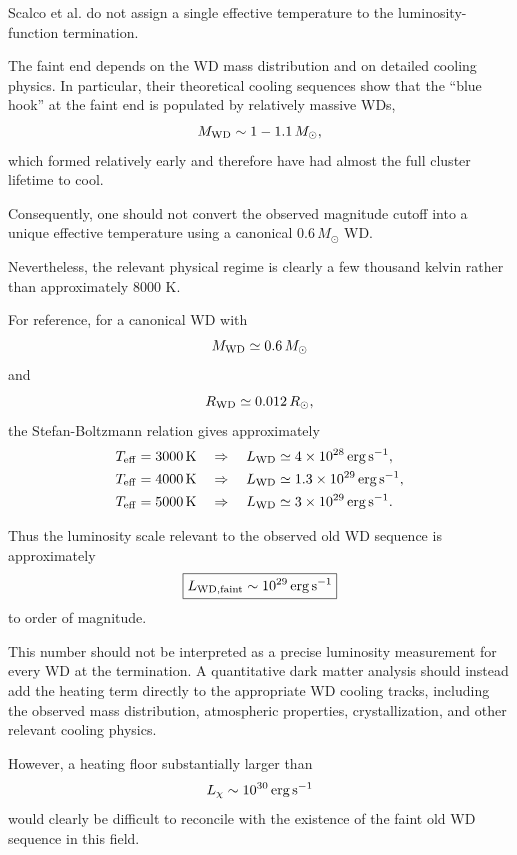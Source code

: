 \documentclass[11pt,a4paper]{article}
\begin{document}
Scalco et al. do not assign a single effective temperature to the luminosity-function termination.

The faint end depends on the WD mass distribution and on detailed cooling physics. In particular, their theoretical cooling sequences show that the ``blue hook'' at the faint end is populated by relatively massive WDs,
\begin{equation}
M_{\rm WD}\sim1-1.1\,M_\odot,
\end{equation}
which formed relatively early and therefore have had almost the full cluster lifetime to cool.

Consequently, one should not convert the observed magnitude cutoff into a unique effective temperature using a canonical $0.6\,M_\odot$ WD.

Nevertheless, the relevant physical regime is clearly a few thousand kelvin rather than approximately $8000$ K.

For reference, for a canonical WD with
\begin{equation}
M_{\rm WD}\simeq0.6\,M_\odot
\end{equation}
and
\begin{equation}
R_{\rm WD}\simeq0.012\,R_\odot,
\end{equation}
the Stefan-Boltzmann relation gives approximately
\begin{align}
T_{\rm eff}=3000\,{\rm K}
&\quad\Rightarrow\quad
L_{\rm WD}\simeq4\times10^{28}\,{\rm erg\,s^{-1}},
\\
T_{\rm eff}=4000\,{\rm K}
&\quad\Rightarrow\quad
L_{\rm WD}\simeq1.3\times10^{29}\,{\rm erg\,s^{-1}},
\\
T_{\rm eff}=5000\,{\rm K}
&\quad\Rightarrow\quad
L_{\rm WD}\simeq3\times10^{29}\,{\rm erg\,s^{-1}}.
\end{align}

Thus the luminosity scale relevant to the observed old WD sequence is approximately
\begin{equation}
\boxed{
L_{\rm WD,faint}\sim10^{29}\,{\rm erg\,s^{-1}}
}
\end{equation}
to order of magnitude.

This number should not be interpreted as a precise luminosity measurement for every WD at the termination. A quantitative dark matter analysis should instead add the heating term directly to the appropriate WD cooling tracks, including the observed mass distribution, atmospheric properties, crystallization, and other relevant cooling physics.

However, a heating floor substantially larger than
\begin{equation}
L_\chi\sim10^{30}\,{\rm erg\,s^{-1}}
\end{equation}
would clearly be difficult to reconcile with the existence of the faint old WD sequence in this field.
\end{document}
